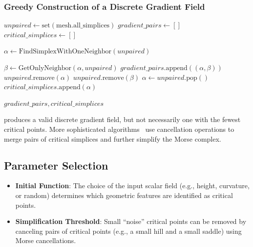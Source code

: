 \subsubsection{Greedy Construction of a Discrete Gradient Field}
\begin{algorithm}
\caption{Greedy Construction of Discrete Gradient Field}\label{alg:greedy_gradient_field}
\begin{algorithmic}
    \State $unpaired \gets \text{set}(\text{mesh.all\_simplices})$
    \State $gradient\_pairs \gets []$
    \State $critical\_simplices \gets []$

        \State $\alpha \gets \text{FindSimplexWithOneNeighbor}(unpaired)$

            \State $\beta \gets \text{GetOnlyNeighbor}(\alpha, unpaired)$
            \State $gradient\_pairs.\text{append}((\alpha, \beta))$
            \State $unpaired.\text{remove}(\alpha)$
            \State $unpaired.\text{remove}(\beta)$
        \Else
            \State $\alpha \gets unpaired.\text{pop}()$
            \State $critical\_simplices.\text{append}(\alpha)$
        \EndIf
    \EndWhile

    \Return $gradient\_pairs, critical\_simplices$
\EndFunction
\end{algorithmic}
\end{algorithm}
 produces a valid discrete gradient field, but not necessarily one with the fewest critical points. More sophisticated algorithms~\cite{gyulassy2008} use cancellation operations to merge pairs of critical simplices and further simplify the Morse complex.

\subsection{Parameter Selection}
\begin{itemize}
    \item \textbf{Initial Function}: The choice of the input scalar field (e.g., height, curvature, or random) determines which geometric features are identified as critical points.
    \item \textbf{Simplification Threshold}: Small ``noise'' critical points can be removed by canceling pairs of critical points (e.g., a small hill and a small saddle) using Morse cancellations.
\end{itemize}

